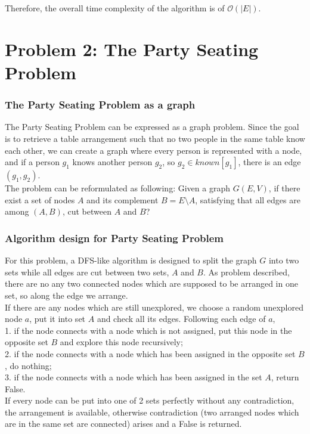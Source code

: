 \documentclass[a4paper,11pt]{article}
\begin{document}
Therefore, the overall time complexity of the algorithm is of $\mathcal{O}(|E|)$. 
\newpage

\part{Problem 2: The Party Seating Problem}
\section{The Party Seating Problem as a graph}
The Party Seating Problem can be expressed as a graph problem. Since the goal is to retrieve a table arrangement such that no two people in the same table know each other, we can create a graph where every person is represented with a node, and if a person $g_{1}$ knows another person $g_{2}$, so $g_{2}\in{known[g_{1}]}$, there is an edge $(g_{1},g_{2})$. \\

The problem can be reformulated as following: 
Given a graph $G(E, V)$, if there exist a set of nodes $A$ and its complement $B = E \setminus A$, satisfying that all edges are among $(A, B)$, cut between $A$ and $B$?

\section{Algorithm design for Party Seating Problem}
For this problem, a DFS-like algorithm is designed to split the graph $G$ into two sets while all edges are cut between two sets, $A$ and $B$. As problem described, there are no any two connected nodes which are supposed to be arranged in one set, so along the edge we arrange. \\

If there are any nodes which are still unexplored, we choose a random unexplored node $a$, put it into set $A$ and check all its edges. Following each edge of $a$,\\
1. if the node connects with a node which is not assigned, put this node in the opposite set $B$ and explore this node recursively; \\

2. if the node connects with a node which has been assigned in the opposite set $B$, do nothing; \\

3. if the node connects with a node which has been assigned in the set $A$, return False. \\

If every node can be put into one of 2 sets perfectly without any contradiction, the arrangement is available, otherwise contradiction (two arranged nodes which are in the same set are connected) arises and a False is returned. \\
\end{document}
